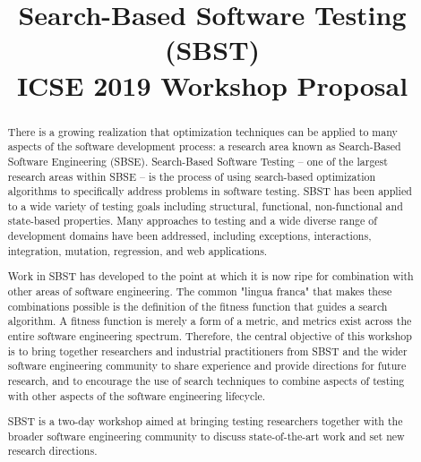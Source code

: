 \documentclass[10pt,conference]{IEEEtran}
\begin{document}
\title{Search-Based Software Testing (SBST) \\ ICSE 2019 Workshop Proposal}



\author{
\and
{}
}

\maketitle

\begin{abstract}
  There is a growing realization that optimization techniques can be
  applied to many aspects of the software development process: a
  research area known as Search-Based Software Engineering
  (SBSE). Search-Based Software Testing -- one of the largest research
  areas within SBSE -- is the process of using search-based
  optimization algorithms to specifically address problems in software
  testing. SBST has been applied to a wide variety of testing goals
  including structural, functional, non-functional and state-based
  properties. Many approaches to testing and a wide diverse range of
  development domains have been addressed, including exceptions,
  interactions, integration, mutation, regression, and web
  applications.

  Work in SBST has developed to the point at which it is now ripe for
  combination with other areas of software engineering. The common
  "lingua franca" that makes these combinations possible is the
  definition of the fitness function that guides a search algorithm. A
  fitness function is merely a form of a metric, and metrics exist
  across the entire software engineering spectrum. Therefore, the
  central objective of this workshop is to bring together researchers
  and industrial practitioners from SBST and the wider software
  engineering community to share experience and provide directions for
  future research, and to encourage the use of search techniques to
  combine aspects of testing with other aspects of the software
  engineering lifecycle.

  SBST is a two-day workshop aimed at bringing testing researchers
  together with the broader software engineering community to discuss
  state-of-the-art work and set new research directions.
\end{abstract}
\end{document}
